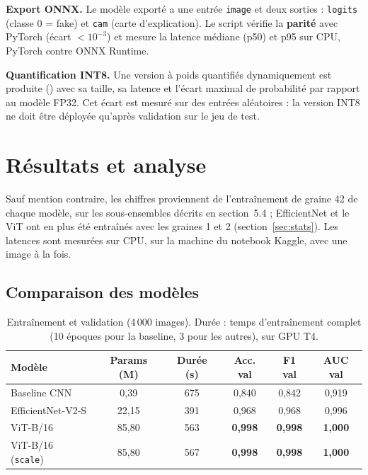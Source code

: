 \documentclass[11pt,a4paper]{article}
\DeclareRobustCommand{\fichier}[1]{\texttt{\StrSubstitute{\detokenize{#1}}{/}{/\allowbreak}}}
\begin{document}
\textbf{Export ONNX.} Le modèle exporté a une entrée \texttt{image} et deux sorties : \texttt{logits} (classe 0 =
fake) et \texttt{cam} (carte d'explication). Le script vérifie la \textbf{parité} avec PyTorch (écart $<10^{-3}$) et
mesure la latence médiane (p50) et p95 sur CPU, PyTorch contre ONNX Runtime.

\textbf{Quantification INT8.} Une version à poids quantifiés dynamiquement est produite
(\fichier{src/utils/quantize.py}) avec sa taille, sa latence et l'écart maximal de probabilité par rapport au modèle
FP32. Cet écart est mesuré sur des entrées aléatoires : la version INT8 ne doit être déployée qu'après validation sur
le jeu de test.

\section{Résultats et analyse}

Sauf mention contraire, les chiffres proviennent de l'entraînement de graine 42 de chaque modèle, sur les sous-ensembles
décrits en section~5.4 ; EfficientNet et le ViT ont en plus été entraînés avec les graines 1 et 2 (section~\ref{sec:stats}). Les latences sont mesurées sur CPU, sur la machine du notebook Kaggle, avec une image à la fois.

\subsection{Comparaison des modèles}

\begin{table}[H]
\centering\small
\begin{tabular}{@{}lccccc@{}}
\toprule
\textbf{Modèle} & \textbf{Params (M)} & \textbf{Durée (s)} & \textbf{Acc. val} & \textbf{F1 val} & \textbf{AUC val} \\
\midrule
Baseline CNN & 0,39 & 675 & 0,840 & 0,842 & 0,919 \\
EfficientNet-V2-S & 22,15 & 391 & 0,968 & 0,968 & 0,996 \\
ViT-B/16 & 85,80 & 563 & \textbf{0,998} & \textbf{0,998} & \textbf{1,000} \\
ViT-B/16 (\texttt{scale}) & 85,80 & 567 & \textbf{0,998} & \textbf{0,998} & \textbf{1,000} \\
\bottomrule
\end{tabular}
\caption{Entraînement et validation (4\,000 images). Durée : temps d'entraînement complet (10 époques pour la baseline, 3 pour les autres), sur GPU T4.}
\end{table}
\end{document}
